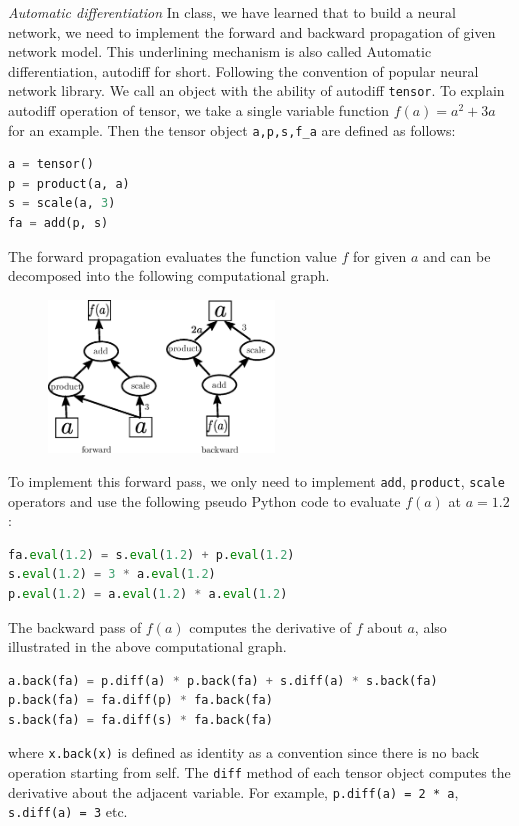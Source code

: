 \documentclass[a4paper, 12pt]{exam}
\begin{document}
	\begin{questions}
		\question \emph{Automatic differentiation} In class, we have learned that to build a neural network, we need to implement the forward
		and backward propagation of given network model. This underlining mechanism is also called Automatic differentiation, autodiff for short.
		Following the convention of popular neural network library. We call an object with the ability of autodiff \texttt{tensor}.
		To explain autodiff operation of tensor, we take a single variable function $f(a) = a^2 + 3a$ for an example. Then the tensor object
		\texttt{a,p,s,f\_a} are defined as follows:
		\begin{lstlisting}[language=Python]
a = tensor()
p = product(a, a)
s = scale(a, 3)
fa = add(p, s)
		\end{lstlisting}
		The forward propagation evaluates the function value $f$ for given $a$ and can be decomposed into the following computational graph.
		\begin{figure}[!ht]
			\centering
			\includegraphics[width=6cm]{auto.eps}
		\end{figure}
		To implement this forward pass, we only need to implement \texttt{add}, \texttt{product}, \texttt{scale} operators and use the following pseudo Python code
		to evaluate $f(a)$ at $a=1.2$:
		\begin{lstlisting}[language=Python]
fa.eval(1.2) = s.eval(1.2) + p.eval(1.2)
s.eval(1.2) = 3 * a.eval(1.2)
p.eval(1.2) = a.eval(1.2) * a.eval(1.2)
		\end{lstlisting}
		The backward pass of $f(a)$ computes the derivative of $f$ about $a$, also illustrated in the above computational graph.
		\begin{lstlisting}[language=Python]
a.back(fa) = p.diff(a) * p.back(fa) + s.diff(a) * s.back(fa)
p.back(fa) = fa.diff(p) * fa.back(fa)
s.back(fa) = fa.diff(s) * fa.back(fa)
		\end{lstlisting}
		where \texttt{x.back(x)} is defined as identity as a convention since there is no back operation starting from self.
		The \texttt{diff} method of each tensor object computes the derivative about the adjacent variable.
		For example, \texttt{p.diff(a) = 2 * a}, \texttt{s.diff(a) = 3} etc.
		

\end{questions}
\end{document}

